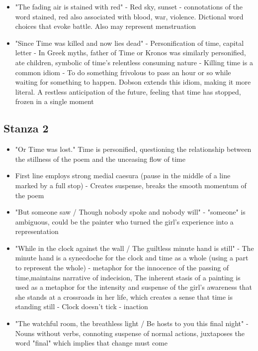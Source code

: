 \begin{itemize}
			\item "The fading air is stained with red" - Red sky, sunset - connotations of the word stained, red also associated with blood, war, violence. Dictional word choices that evoke battle. Also may represent menstruation
			\item "Since Time was killed and now lies dead" - Personification of time, capital letter - In Greek myths, father of Time or Kronos was similarly personified, ate children, symbolic of time's relentless consuming nature - Killing time is a common idiom - To do something frivolous to pass an hour or so while waiting for something to happen. Dobson extends this idiom, making it more literal. A restless anticipation of the future, feeling that time has stopped, frozen in a single moment
		\end{itemize}

	\subsection{Stanza 2}
		\begin{itemize}
			\item "Or Time was lost." Time is personified, questioning the relationship between the stillness of the poem and the unceasing flow of time
			\item First line employs strong medial caesura (pause in the middle of a line marked by a full stop) - Creates suspense, breaks the smooth momentum of the poem
			\item "But someone saw / Though nobody spoke and nobody will" - "someone" is ambiguous, could be the painter who turned the girl's experience into a representation
			\item "While in the clock against the wall / The guiltless minute hand is still" - The minute hand is a synecdoche for the clock and time as a whole (using a part to represent the whole) - metaphor for the innocence of the passing of time,maintains narrative of indecision, The inherent stasis of a painting is used as a metaphor for the intensity and suspense of the girl's awareness that she stands at a crossroads in her life, which creates a sense that time is standing still - Clock doesn't tick - inaction
			\item "The watchful room, the breathless light / Be hosts to you this final night" - Nouns without verbs, connoting suspense of normal actions, juxtaposes the word "final" which implies that change must come
		\end{itemize}


